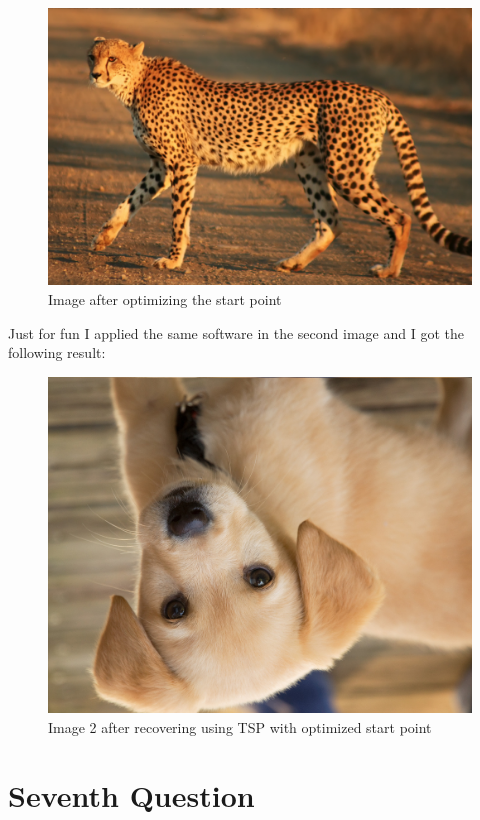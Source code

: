 \documentclass{article}
\begin{document}
\begin{figure}[H]
\includegraphics[scale=0.3]{TSP_OUTPUT_Perfect.png}
\caption{Image after optimizing the start point}
\end{figure}
Just for fun I applied the same software in the second image and I got the following result:
\begin{figure}[H]
\includegraphics[scale=0.4]{TSP_OUTPUT2.png}
\caption{Image 2 after recovering using TSP with optimized start point}
\end{figure}
\section*{Seventh Question}
\end{document}
